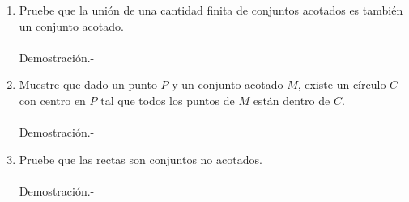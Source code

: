\begin{enumerate}
    \item Pruebe que la unión de una cantidad finita de conjuntos acotados es también un conjunto acotado.\\\\
    Demostración.-\;

    \item Muestre que dado un punto $P$ y un conjunto acotado $M$, existe un círculo $C$ con centro en $P$ tal que todos los puntos de $M$ están dentro de $C.$\\\\
    Demostración.-\;

    \item Pruebe que las rectas son conjuntos no acotados.\\\\
    Demostración.-\;

\end{enumerate}
